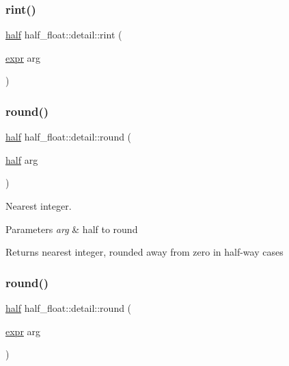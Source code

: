 \subsubsection{\texorpdfstring{rint()}{rint()}\hspace{0.1cm}{\footnotesize\ttfamily [2/2]}}
{\footnotesize\ttfamily \hyperlink{classhalf__float_1_1half}{half} half\+\_\+float\+::detail\+::rint (\begin{DoxyParamCaption}\item[{\hyperlink{structhalf__float_1_1detail_1_1expr}{expr}}]{arg }\end{DoxyParamCaption})\hspace{0.3cm}{\ttfamily [inline]}}

\mbox{\label{namespacehalf__float_1_1detail_ae60c2e9b87102c08084c81d546113c91}} 
\subsubsection{\texorpdfstring{round()}{round()}\hspace{0.1cm}{\footnotesize\ttfamily [1/2]}}
{\footnotesize\ttfamily \hyperlink{classhalf__float_1_1half}{half} half\+\_\+float\+::detail\+::round (\begin{DoxyParamCaption}\item[{\hyperlink{classhalf__float_1_1half}{half}}]{arg }\end{DoxyParamCaption})\hspace{0.3cm}{\ttfamily [inline]}}

Nearest integer. 
\begin{DoxyParams}{Parameters}
{\em arg} & half to round \\
\hline
\end{DoxyParams}
\begin{DoxyReturn}{Returns}
nearest integer, rounded away from zero in half-\/way cases 
\end{DoxyReturn}
\mbox{\label{namespacehalf__float_1_1detail_ab5b61d50f0c874faf8d0a949386242ff}} 
\subsubsection{\texorpdfstring{round()}{round()}\hspace{0.1cm}{\footnotesize\ttfamily [2/2]}}
{\footnotesize\ttfamily \hyperlink{classhalf__float_1_1half}{half} half\+\_\+float\+::detail\+::round (\begin{DoxyParamCaption}\item[{\hyperlink{structhalf__float_1_1detail_1_1expr}{expr}}]{arg }\end{DoxyParamCaption})\hspace{0.3cm}{\ttfamily [inline]}}

